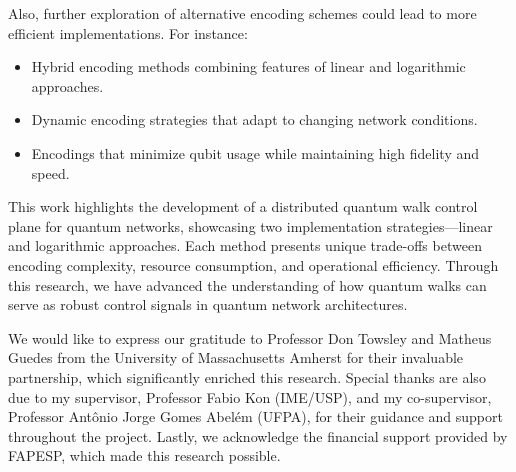 \documentclass{article}
\begin{document}
	Also, further exploration of alternative encoding schemes could lead to more efficient implementations. For instance:
	\begin{itemize}
		\item Hybrid encoding methods combining features of linear and logarithmic approaches.
		\item Dynamic encoding strategies that adapt to changing network conditions.
		\item Encodings that minimize qubit usage while maintaining high fidelity and speed.
	\end{itemize}

	This work highlights the development of a distributed quantum walk control plane for quantum networks, showcasing two implementation strategies—linear and logarithmic approaches. Each method presents unique trade-offs between encoding complexity, resource consumption, and operational efficiency. Through this research, we have advanced the understanding of how quantum walks can serve as robust control signals in quantum network architectures.

	We would like to express our gratitude to Professor Don Towsley and Matheus Guedes from the University of Massachusetts Amherst for their invaluable partnership, which significantly enriched this research. Special thanks are also due to my supervisor, Professor Fabio Kon (IME/USP), and my co-supervisor, Professor Antônio Jorge Gomes Abelém (UFPA), for their guidance and support throughout the project. Lastly, we acknowledge the financial support provided by FAPESP, which made this research possible.
		

\pagebreak
\printbibliography[]
\end{document}
